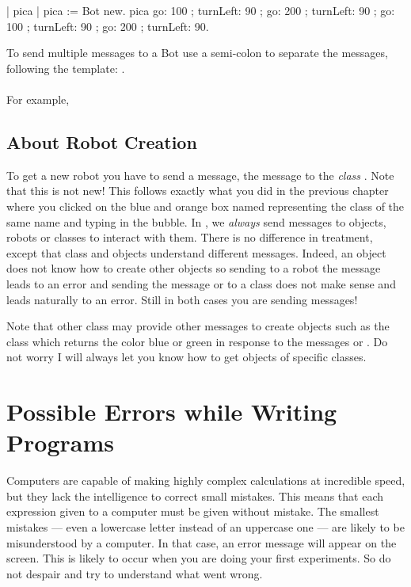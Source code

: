 \begin{scriptwithouttitle}\label{scr:firstScriptsemi}
| pica |
pica := Bot new.
pica 
   go: 100 ; turnLeft: 90 ; go: 200 ; turnLeft: 90 ; 
   go: 100 ; turnLeft: 90 ; go: 200 ; turnLeft: 90.
\end{scriptwithouttitle}



\begin{largecadre}{To send multiple messages to a Bot use a semi-colon \ct{;} to separate the messages, following the template: . \\ \\
For example, }
\end{largecadre}

\subsection{About Robot Creation}

To get a new robot you have to send a message, the message  to the \emph{class} . Note that this is not new! This follows exactly what you did in the previous chapter where you clicked on the blue and orange box named  representing the class of the same name and typing  in the bubble. In \sq, we \emph{always} send messages to objects, robots or classes to interact with them. There is no difference in treatment, except that class and objects understand different messages. Indeed, an object does not know how to create other objects so sending to a robot the message  leads to an error and sending the message  or  to a class does not make sense and leads naturally to an error. Still in both cases you are sending messages!

Note that other class may provide other messages to create objects such as the class  which returns the color blue or green in response to the messages  or . Do not worry I will always let you know how to get objects of specific classes. 


\section{Possible Errors while Writing Programs}
Computers are capable of making highly complex calculations at incredible speed, but they lack the intelligence to correct small mistakes. This means that each expression given to a computer must be given without mistake. The smallest mistakes --- even a lowercase letter instead of an uppercase one --- are likely to be misunderstood by a computer.  In that case, an error message will appear on the screen. This is likely to occur when you are doing your first experiments. So do not despair and try to understand what went wrong. 


